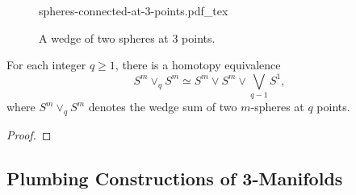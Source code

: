 \begin{remark}
\end{remark}

\begin{figure}[ht]
	\centering
{spheres-connected-at-3-points.pdf_tex}
\caption{A wedge of two spheres at $3$ points.}
\end{figure}

\begin{proposition}
	For each integer $q\geq 1$, there is a homotopy equivalence
	\[
			S^m\vee_q S^m \simeq S^m\vee S^m \vee \bigvee_{q-1} S^1,
	\]
	where $S^m\vee_q S^m$ denotes the wedge sum of two $m$-spheres at $q$ points.
\end{proposition}

\begin{proof}
\end{proof}

\subsection*{Plumbing Constructions of 3-Manifolds}
